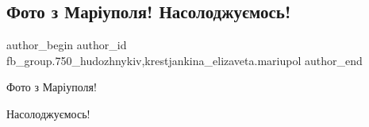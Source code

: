  
 
 
 
 

\subsection{Фото з Маріуполя!  Насолоджуємось!}
\label{sec:26_04_2019.fb.fb_group.750_hudozhnykiv.2.foto_z_mariupolja}
 
\ifcmt
 author_begin
   author_id fb_group.750_hudozhnykiv,krestjankina_elizaveta.mariupol
 author_end
\fi

Фото з Маріуполя! 

Насолоджуємось!
